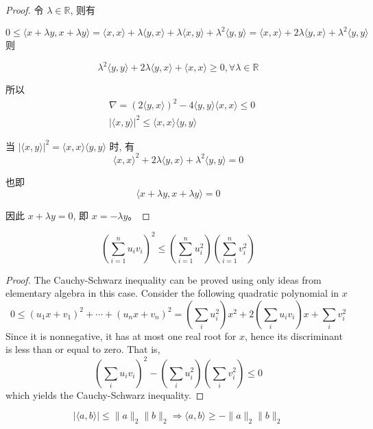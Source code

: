 \begin{proof}
    令 $\lambda \in \mathbb{R}$, 则有 
    
    $$0 \leq\langle x+\lambda y, x+\lambda y\rangle=\langle x, x\rangle+\lambda\langle y, x\rangle+\lambda\langle x, y\rangle+\lambda^{2}\langle y, y\rangle=\langle x, x\rangle+2 \lambda\langle y, x\rangle+\lambda^{2}\langle y, y\rangle$$
则 

$$\lambda^{2}\langle y, y\rangle+2 \lambda\langle y, x\rangle+\langle x, x\rangle \geq 0, \forall \lambda \in \mathbb{R}$$

所以
$$
\begin{aligned}
&\nabla=(2\langle y, x\rangle)^{2}-4\langle y, y\rangle\langle x, x\rangle \leq 0 \\
&|\langle x, y\rangle|^{2} \leq\langle x, x\rangle\langle y, y\rangle
\end{aligned}
$$

当 $|\langle x, y\rangle|^{2}=\langle x, x\rangle\langle y, y\rangle$ 时, 有 $$\langle x, x\rangle^{2}+2 \lambda\langle y, x\rangle+\lambda^{2}\langle y, y\rangle=0$$

也即 $$\langle x+\lambda y, x+\lambda y\rangle=0$$

因此 $x+\lambda y=0$, 即 $x=-\lambda y$。
\end{proof}

\begin{theorem}
    $$\left(\sum_{i=1}^{n} u_{i} v_{i}\right)^{2} \leq\left(\sum_{i=1}^{n} u_{i}^{2}\right)\left(\sum_{i=1}^{n} v_{i}^{2}\right)$$
\end{theorem}

\begin{proof}
    The Cauchy-Schwarz inequality can be proved using only ideas from elementary algebra in this case. Consider the following quadratic polynomial in $x$
$$
0 \leq\left(u_{1} x+v_{1}\right)^{2}+\cdots+\left(u_{n} x+v_{n}\right)^{2}=\left(\sum_{i} u_{i}^{2}\right) x^{2}+2\left(\sum_{i} u_{i} v_{i}\right) x+\sum_{i} v_{i}^{2}
$$
Since it is nonnegative, it has at most one real root for $x$, hence its discriminant is less than or equal to zero. That is,
$$
\left(\sum_{i} u_{i} v_{i}\right)^{2}-\left(\sum_{i} u_{i}^{2}\right)\left(\sum_{i} v_{i}^{2}\right) \leq 0
$$
which yields the Cauchy-Schwarz inequality.
\end{proof}

\begin{corollary}
    $$|\langle a,b \rangle| \le \| a \|_2 \| b \|_2 \Rightarrow
    \langle a,b \rangle \ge -\| a \|_2 \| b \|_2
    $$
\end{corollary}

